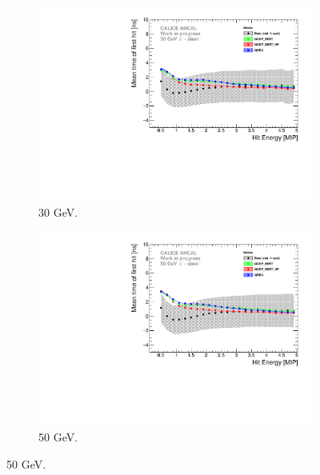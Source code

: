 
\begin{figure}[htbp!]
  \begin{subfigure}[t]{0.5\textwidth}
    \centering
    \includegraphics[width=1\textwidth]{../Thesis_Plots/Timing/Pions/Plots/ComparisonToSim/Time_Energy_30GeV_Mokka.pdf}
    \caption{30 GeV.}\label{fig:Energy_SimData_30GeV}
  \end{subfigure}
  \hfill
  \begin{subfigure}[t]{0.5\textwidth}
    \centering
    \includegraphics[width=1\textwidth]{../Thesis_Plots/Timing/Pions/Plots/ComparisonToSim/Time_Energy_50GeV_Mokka.pdf}
    \caption{50 GeV.} \label{fig:Energy_SimData_50GeV}
  \end{subfigure}

\end{figure}

